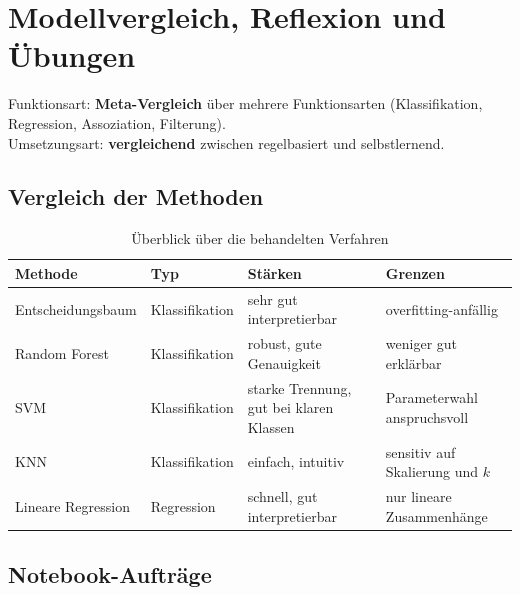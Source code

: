 \chapter{Modellvergleich, Reflexion und Übungen}

\begin{myremark}
Funktionsart: \textbf{Meta-Vergleich} über mehrere Funktionsarten (Klassifikation, Regression, Assoziation, Filterung). \\
Umsetzungsart: \textbf{vergleichend} zwischen regelbasiert und selbstlernend.
\end{myremark}

\section{Vergleich der Methoden}

\begin{table}[H]
\centering
\small
\begin{tabular}{p{2.8cm}p{2.4cm}p{3.4cm}p{3.4cm}}
\toprule
\textbf{Methode} & \textbf{Typ} & \textbf{Stärken} & \textbf{Grenzen} \\
\midrule
Entscheidungsbaum & Klassifikation & sehr gut interpretierbar & overfitting-anfällig \\
\midrule
Random Forest & Klassifikation & robust, gute Genauigkeit & weniger gut erklärbar \\
\midrule
SVM & Klassifikation & starke Trennung, gut bei klaren Klassen & Parameterwahl anspruchsvoll \\
\midrule
KNN & Klassifikation & einfach, intuitiv & sensitiv auf Skalierung und \(k\) \\
\midrule
Lineare Regression & Regression & schnell, gut interpretierbar & nur lineare Zusammenhänge \\
\bottomrule
\end{tabular}
\caption{Überblick über die behandelten Verfahren}
\label{tab:modelle-15}
\end{table}

\section{Notebook-Aufträge}

